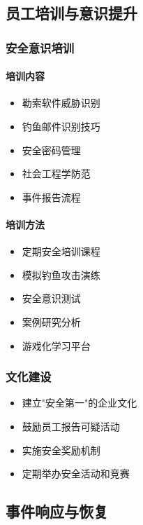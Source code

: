 \documentclass[12pt,a4paper]{article}
\begin{document}
\subsection{员工培训与意识提升}

\subsubsection{安全意识培训}

\paragraph{培训内容}
\begin{itemize}
    \item 勒索软件威胁识别
    \item 钓鱼邮件识别技巧
    \item 安全密码管理
    \item 社会工程学防范
    \item 事件报告流程
\end{itemize}

\paragraph{培训方法}
\begin{itemize}
    \item 定期安全培训课程
    \item 模拟钓鱼攻击演练
    \item 安全意识测试
    \item 案例研究分析
    \item 游戏化学习平台
\end{itemize}

\subsubsection{文化建设}
\begin{itemize}
    \item 建立"安全第一"的企业文化
    \item 鼓励员工报告可疑活动
    \item 实施安全奖励机制
    \item 定期举办安全活动和竞赛
\end{itemize}

\subsection{事件响应与恢复}
\end{document}

